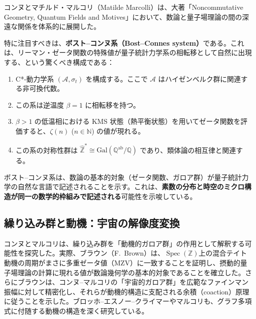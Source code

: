 \documentclass[12pt,a4paper]{ltjsarticle}
\theoremstyle{definition}
\newcommand{\Spec}{\operatorname{Spec}}
\begin{document}
コンヌとマチルド・マルコリ（Matilde Marcolli）は、大著「Noncommutative Geometry, Quantum Fields and Motives」\cite{ConnesMarcolli2008}において、数論と量子場理論の間の深遠な関係を体系的に展開した。

特に注目すべきは、\textbf{ボスト--コンヌ系（Bost--Connes system）}\cite{BostConnes1995}である。これは、リーマン・ゼータ関数の特殊値が量子統計力学系の相転移として自然に出現する、という驚くべき構成である：

\begin{enumerate}[leftmargin=2em]
  \item C*-動力学系 $(\mathcal{A}, \sigma_t)$ を構成する。ここで $\mathcal{A}$ はハイゼンベルク群に関連する非可換代数。
  \item この系は逆温度 $\beta = 1$ に相転移を持つ。
  \item $\beta > 1$ の低温相における KMS 状態（熱平衡状態）を用いてゼータ関数を評価すると、$\zeta(n)$ ($n \in \mathbb{N}$) の値が現れる。
  \item この系の対称性群は $\hat{\mathbb{Z}}^* \cong \mathrm{Gal}(\mathbb{Q}^{\mathrm{ab}}/\mathbb{Q})$ であり、類体論の相互律と関連する。
\end{enumerate}

\begin{physbox}[物理学的含意]
ボスト--コンヌ系は、数論の基本的対象（ゼータ関数、ガロア群）が量子統計力学の自然な言語で記述されることを示す。これは、\textbf{素数の分布と時空のミクロ構造が同一の数学的枠組みで記述される}可能性を示唆している。
\end{physbox}

\subsection{繰り込み群と動機：宇宙の解像度変換}

コンヌとマルコリは、繰り込み群を「動機的ガロア群」の作用として解釈する可能性を探究した\cite{ConnesMarcolli2008, ConnesMarcolli2004}。実際、ブラウン（F.~Brown）\cite{Brown2012}は、$\Spec(\mathbb{Z})$上の混合テイト動機の周期がまさに多重ゼータ値（MZV）に一致することを証明し、摂動的量子場理論の計算に現れる値が数論幾何学の基本的対象であることを確立した。さらにブラウン\cite{Brown2017}は、コンヌ--マルコリの「宇宙的ガロア群」を広範なファインマン振幅に対して精密化し、それらが動機的構造に支配される余積（coaction）原理に従うことを示した。ブロッホ--エスノー--クライマー\cite{BlochEsnaultKreimer2006}やマルコリ\cite{Marcolli2010}も、グラフ多項式に付随する動機の構造を深く研究している。
\end{document}
